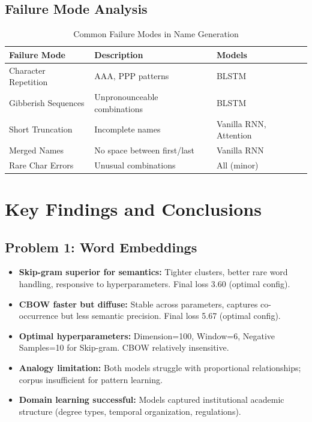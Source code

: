 \documentclass[12pt,a4paper]{article}
\begin{document}
\subsection{Failure Mode Analysis}

\begin{table}[H]
\centering
\small
\begin{tabular}{|l|l|l|}
\hline
\textbf{Failure Mode} & \textbf{Description} & \textbf{Models} \\
\hline
Character Repetition & AAA, PPP patterns & BLSTM \\
Gibberish Sequences & Unpronounceable combinations & BLSTM \\
Short Truncation & Incomplete names & Vanilla RNN, Attention \\
Merged Names & No space between first/last & Vanilla RNN \\
Rare Char Errors & Unusual combinations & All (minor) \\
\hline
\end{tabular}
\caption{Common Failure Modes in Name Generation}
\end{table}

\section{Key Findings and Conclusions}

\subsection{Problem 1: Word Embeddings}

\begin{itemize}
    \item \textbf{Skip-gram superior for semantics:} Tighter clusters, better rare word handling, responsive to hyperparameters. Final loss 3.60 (optimal config).
    
    \item \textbf{CBOW faster but diffuse:} Stable across parameters, captures co-occurrence but less semantic precision. Final loss 5.67 (optimal config).
    
    \item \textbf{Optimal hyperparameters:} Dimension=100, Window=6, Negative Samples=10 for Skip-gram. CBOW relatively insensitive.
    
    \item \textbf{Analogy limitation:} Both models struggle with proportional relationships; corpus insufficient for pattern learning.
    
    \item \textbf{Domain learning successful:} Models captured institutional academic structure (degree types, temporal organization, regulations).
\end{itemize}
\end{document}
